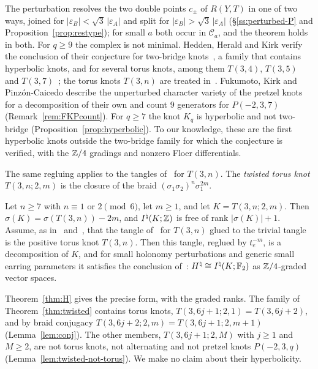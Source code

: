 The perturbation resolves the two double points $c_\pm$ of $R(Y,T)$ in one of two ways, joined for
$|\varepsilon_B|<\sqrt3\,|\varepsilon_A|$ and split for $|\varepsilon_B|>\sqrt3\,|\varepsilon_A|$ (\S\ref{ss:perturbed-P} and
Proposition~\ref{prop:restype}); for small $a$ both occur in $\mathcal C_a$, and the theorem holds in both. For $q\ge9$ the complex is not minimal. Hedden, Herald and
Kirk verify the conclusion of their conjecture for two-bridge knots~\cite[\S7]{HHK2}, a family that
contains hyperbolic knots, and for several torus knots, among them $T(3,4)$, $T(3,5)$ and $T(3,7)$~\cite[\S\S10--11]{HHK2}; the torus knots
$T(3,n)$ are treated in~\cite{WuebbenV}. Fukumoto, Kirk and Pinz\'on-Caicedo describe the unperturbed
character variety of the pretzel knots for a decomposition of their own and count $9$ generators for
$P(-2,3,7)$~\cite[\S5]{FKP}
(Remark~\ref{rem:FKPcount}). For $q\ge7$ the knot $K_q$ is hyperbolic and not two-bridge
(Proposition~\ref{prop:hyperbolic}). To our knowledge, these are the first hyperbolic knots outside the
two-bridge family for which the conjecture is verified, with the $\mathbb{Z}/4$ gradings and nonzero Floer
differentials.

The same regluing applies to the tangles of~\cite[\S10]{HHK2} for $T(3,n)$. The \emph{twisted torus knot}
$T(3,n;2,m)$ is the closure of the braid $(\sigma_1\sigma_2)^n\sigma_1^{2m}$.

\begin{theorem}\label{thm:twisted}
Let $n\ge7$ with $n\equiv1$ or $2\pmod 6$, let $m\ge1$, and let $K=T(3,n;2,m)$. Then
$\sigma(K)=\sigma(T(3,n))-2m$, and $I^{\natural}(K;\mathbb{Z})$ is free of rank $|\sigma(K)|+1$. Assume, as in~\cite{HHK2}
and~\cite{WuebbenV}, that the tangle of~\cite[\S10]{HHK2} for $T(3,n)$ glued to the trivial tangle is the positive
torus knot $T(3,n)$. Then this tangle, reglued by $t_e^{-m}$, is a decomposition of $K$, and for small holonomy
perturbations and generic small earring parameters it satisfies the conclusion of~\cite[Conj.~6.5]{HHK2}:
$H^{\natural}\cong I^{\natural}(K;\mathbb{F}_2)$ as $\mathbb{Z}/4$-graded vector spaces.
\end{theorem}

Theorem~\ref{thm:H} gives the precise form, with the graded ranks. The family of
Theorem~\ref{thm:twisted} contains torus knots, $T(3,6j+1;2,1)=T(3,6j+2)$, and by braid conjugacy
$T(3,6j+2;2,m)=T(3,6j+1;2,m+1)$ (Lemma~\ref{lem:conj}). The other members, $T(3,6j+1;2,M)$ with $j\ge1$
and $M\ge2$, are not torus knots, not alternating and not pretzel knots
$P(-2,3,q)$ (Lemma~\ref{lem:twisted-not-torus}). We make no claim about their hyperbolicity.

